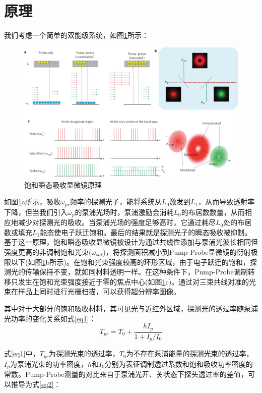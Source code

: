 \documentclass{phyasgn}\usepackage{nag}
\begin{document}
\section{原理}
我们考虑一个简单的双能级系统，如图\ref{1}所示：
	\begin{figure}[!h]
	\centering
	\includegraphics[width=.95\linewidth]{pic/1.png}
	\caption[饱和吸收显微镜原理]{饱和瞬态吸收显微镜原理\cite{wang2013far}}\vspace{1ex}
	\label{1}
	\end{figure}
    \par 如图\ref{1}a所示，吸收$\omega_{pr}$频率的探测光子，能将系统从$L_{0}$激发到$L_{1}$，从而导致透射率下降，但当我们引入$\omega_{p}$的泵浦光场时，泵浦激励会消耗$L_{0}$的布居数数量，从而相应地减少对探测光的吸收。当泵浦光场的强度足够高时，它通过耗尽$L_{0}$处的布居数或填充$L_{1}$能态使电子跃迁饱和。最后的结果就是探测光子的瞬态吸收被抑制。基于这一原理，饱和瞬态吸收显微镜被设计为通过共线性添加与泵浦光波长相同但强度更高的非调制饱和光束($\omega_{sat}$)，将探测面积减小到Pump-Probe显微镜的衍射极限以下(如图\ref{1}b所示)。在饱和光束强度较高的环形区域，由于电子跃迁的饱和，探测光的传输保持不变，就如同材料透明一样。在这种条件下，Pump-Probe调制转移只发生在饱和光束强度接近于零的焦点中心(如图\ref{1}c)。通过对三束共线对准的光束在样品上同时进行光栅扫描，可以获得超分辨率图像。
    \par 其中对于大部分的饱和吸收材料，其可见光与近红外区域，探测光的透过率随泵浦光功率的变化关系如式\eqref{eq1}：
    \begin{equation}
    T_{pr}=T_{0}+\dfrac{hI_{p}}{1+I_{p}/I_{0}}
    \label{eq1}
    \end{equation}
    \par 式\eqref{eq1}中，$T_{pr}$为探测光束的透过率，$T_{0}$为不存在泵浦能量的探测光束的透过率，$I_{p}$为泵浦光束的功率密度，$h$和$I_{0}$分别为表征调制透过系数和饱和吸收功率密度的常数。Pump-Probe测量的对比来自于泵浦光开、关状态下探头透过率的差值，可以推导为式\eqref{eq2}：
\end{document}
